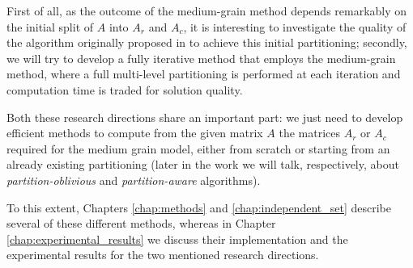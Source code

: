 First of all, as the outcome of the medium-grain method depends remarkably on the initial split of $A$ into $A_r$ and $A_c$, it is interesting to investigate the quality of the algorithm originally proposed in \cite{mondriaan} to achieve this initial partitioning; secondly, we will try to develop a fully iterative method that employs the medium-grain method, where a full multi-level partitioning is performed at each iteration and computation time is traded for solution quality.

Both these research directions share an important part: we just need to develop efficient methods to compute from the given matrix $A$ the matrices $A_r$ or $A_c$ required for the medium grain model, either from scratch or starting from an already existing partitioning (later in the work we will talk, respectively, about \emph{partition-oblivious} and \emph{partition-aware} algorithms). 

To this extent, Chapters \ref{chap:methods} and \ref{chap:independent_set} describe several of these different methods, whereas in Chapter \ref{chap:experimental_results} we discuss their implementation and the experimental results for the two mentioned research directions.
